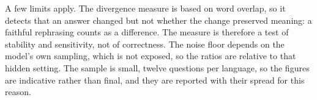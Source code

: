 A few limits apply. The divergence measure is based on word overlap, so it detects that an answer changed but not whether the change preserved meaning: a faithful rephrasing counts as a difference. The measure is therefore a test of stability and sensitivity, not of correctness. The noise floor depends on the model's own sampling, which is not exposed, so the ratios are relative to that hidden setting. The sample is small, twelve questions per language, so the figures are indicative rather than final, and they are reported with their spread for this reason.



